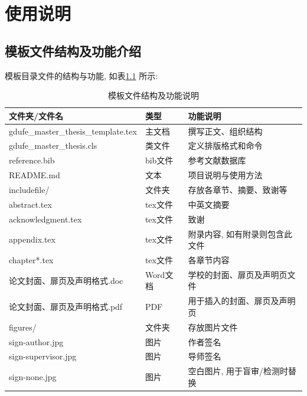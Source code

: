 \chapter{使用说明}
\section{模板文件结构及功能介绍}
模板目录文件的结构与功能, 如表\ref{table:filestructure} 所示:
\begin{table}[!ht]
    \centering
    \caption{模板文件结构及功能说明}\label{table:filestructure}
    \begin{tabular}{lll}
        \toprule
        文件夹/文件名                             & 类型     & 功能说明             \\
        \midrule
        gdufe\_master\_thesis\_template.tex & 主文档    & 撰写正文、组织结构        \\
        gdufe\_master\_thesis.cls           & 类文件    & 定义排版格式和命令        \\
        reference.bib                       & bib文件  & 参考文献数据库          \\
        README.md                           & 文本     & 项目说明与使用方法        \\
        includefile/                        & 文件夹    & 存放各章节、摘要、致谢等     \\
        \quad abstract.tex                  & tex文件  & 中英文摘要            \\
        \quad acknowledgment.tex            & tex文件  & 致谢               \\
        \quad appendix.tex                  & tex文件  & 附录内容, 如有附录则包含此文件 \\
        \quad chapter*.tex                  & tex文件  & 各章节内容            \\
        \quad 论文封面、扉页及声明格式.doc              & Word文档 & 学校的封面、扉页及声明页文件   \\
        \quad 论文封面、扉页及声明格式.pdf              & PDF    & 用于插入的封面、扉页及声明页   \\
        figures/                            & 文件夹    & 存放图片文件           \\
        \quad sign-author.jpg               & 图片     & 作者签名             \\
        \quad sign-supervisor.jpg           & 图片     & 导师签名             \\
        \quad sign-none.jpg                 & 图片     & 空白图片, 用于盲审/检测时替换 \\

\end{tabular}
\end{table}
